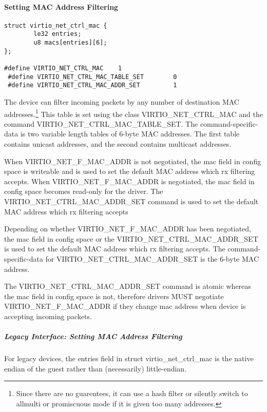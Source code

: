 \paragraph{Setting MAC Address Filtering}\label{sec:Device Types / Network Device / Device Operation / Control Virtqueue / Setting MAC Address Filtering}

\begin{lstlisting}
struct virtio_net_ctrl_mac {
        le32 entries;
        u8 macs[entries][6];
};

#define VIRTIO_NET_CTRL_MAC    1
 #define VIRTIO_NET_CTRL_MAC_TABLE_SET        0
 #define VIRTIO_NET_CTRL_MAC_ADDR_SET         1
\end{lstlisting}

The device can filter incoming packets by any number of destination
MAC addresses.\footnote{Since there are no guarentees, it can use a hash filter or
silently switch to allmulti or promiscuous mode if it is given too
many addresses.
} This table is set using the class
VIRTIO_NET_CTRL_MAC and the command VIRTIO_NET_CTRL_MAC_TABLE_SET. The
command-specific-data is two variable length tables of 6-byte MAC
addresses. The first table contains unicast addresses, and the second
contains multicast addresses.

When VIRTIO_NET_F_MAC_ADDR is not negotiated, the mac field in
config space is writeable and is used to set the default MAC
address which rx filtering accepts.
When VIRTIO_NET_F_MAC_ADDR is negotiated, the mac field in
config space becomes read-only for the driver.
The VIRTIO_NET_CTRL_MAC_ADDR_SET command is used to set the
default MAC address which rx filtering
accepts

Depending on whether VIRTIO_NET_F_MAC_ADDR has been negotiated,
the mac field in config space or the VIRTIO_NET_CTRL_MAC_ADDR_SET
is used to set the default MAC address which rx filtering
accepts.
The command-specific-data for VIRTIO_NET_CTRL_MAC_ADDR_SET is
the 6-byte MAC address.

The
VIRTIO_NET_CTRL_MAC_ADDR_SET command is atomic whereas the
mac field in config space is not, therefore drivers
MUST negotiate VIRTIO_NET_F_MAC_ADDR if they change
mac address when device is accepting incoming packets.

\subparagraph{Legacy Interface: Setting MAC Address Filtering}\label{sec:Device Types / Network Device / Device Operation / Control Virtqueue / Setting MAC Address Filtering / Legacy Interface: Setting MAC Address Filtering}
For legacy devices, the entries field in struct virtio_net_ctrl_mac is the
native endian of the guest rather than (necessarily) little-endian.

